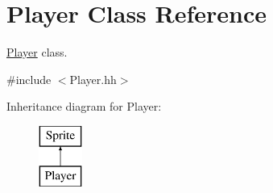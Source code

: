 \hypertarget{classPlayer}{\section{Player Class Reference}
\label{classPlayer}
}


\hyperlink{classPlayer}{Player} class.  




{\ttfamily \#include $<$Player.\-hh$>$}

Inheritance diagram for Player\-:\begin{figure}[H]
\begin{center}
\leavevmode
\includegraphics[height=2.000000cm]{classPlayer}
\end{center}
\end{figure}
